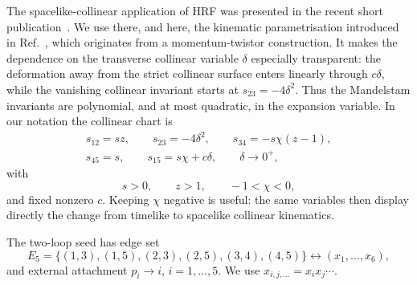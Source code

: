\documentclass[a4paper,11pt]{article}
\begin{document}
The spacelike-collinear application of HRF was presented in the recent short
publication~\cite{Chen:2026dnj}.  We use there, and here, the kinematic
parametrisation introduced in Ref.~\cite{Henn:2024qjq}, which originates from
a momentum-twistor construction.  It makes the dependence on the transverse
collinear variable \(\delta\) especially transparent: the deformation away
from the strict collinear surface enters linearly through \(c\delta\), while
the vanishing collinear invariant starts at \(s_{23}=-4\delta^2\).  Thus the
Mandelstam invariants are polynomial, and at most quadratic, in the expansion
variable.  In our notation the collinear chart is
\begin{equation}
 \begin{gathered}
 s_{12}=sz,\qquad s_{23}=-4\delta^2,\qquad
 s_{34}=-s\chi(z-1),\\
 s_{45}=s,\qquad s_{15}=s\chi+c\delta,\qquad \delta\to0^+,
 \end{gathered}
 \label{eq:five-kinematics}
\end{equation}
with
\begin{equation}
 s>0,\qquad z>1,\qquad -1<\chi<0,
 \label{eq:five-domain}
\end{equation}
and fixed nonzero \(c\).  Keeping \(\chi\) negative is useful: the same
variables then display directly the change from timelike to spacelike
collinear kinematics.

The two-loop seed has edge set
\begin{equation}
 E_5=\{(1,3),(1,5),(2,3),(2,5),(3,4),(4,5)\}
 \longleftrightarrow (x_1,\ldots,x_6),
 \label{eq:five-edges}
\end{equation}
and external attachment \(p_i\to i\), \(i=1,\ldots,5\).  We use
\(x_{i,j,\ldots}=x_ix_j\cdots\).
\end{document}
